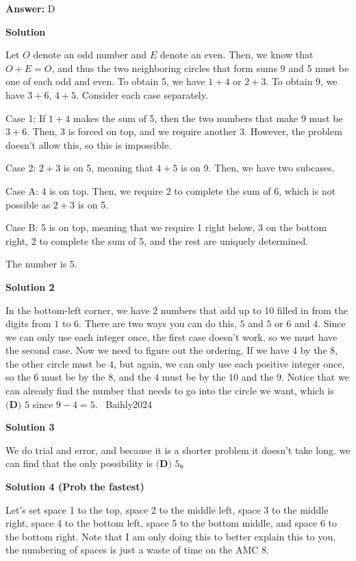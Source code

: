 \begin{enumerate}
 \textbf{Answer: }D



\textbf{Solution}

Let $O$ denote an odd number and $E$ denote an even. Then, we know that $O+E = O$, and thus the two neighboring circles that form sums 9 and 5 must be one of each odd and even. To obtain 5, we have $1+4$ or $2+3$. To obtain 9, we have $3+6$, $4+5$. Consider each case separately.

 Case 1: If $1+4$ makes the sum of 5, then the two numbers that make 9 must be $3+6$. Then, 3 is forced on top, and we require another 3. However, the problem doesn't allow this, so this is impossible.

 Case 2: $2+3$ is on 5, meaning that $4+5$ is on 9. Then, we have two subcases.

 Case A: 4 is on top. Then, we require 2 to complete the sum of 6, which is not possible as $2+3$ is on 5.

 Case B: 5 is on top, meaning that we require 1 right below, 3 on the bottom right, 2 to complete the sum of 5, and the rest are uniquely determined.

 The number is $\boxed{5}$.

 



\textbf{Solution 2}

In the bottom-left corner, we have 2 numbers that add up to 10 filled in from the digits from $1$ to $6$. There are two ways you can do this, $5$ and $5$ or $6$ and $4$. Since we can only use each integer once, the first case doesn't work, so we must have the second case. Now we need to figure out the ordering. If we have $4$ by the $8$, the other circle must be $4$, but again, we can only use each positive integer once, so the $6$ must be by the $8$, and the $4$ must be by the $10$ and the $9$. Notice that we can already find the number that needs to go into the circle we want, which is $\boxed{\textbf{(D) }5}$ since $9-4=5$. ~Baihly2024

 



\textbf{Solution 3}

We do trial and error, and because it is a shorter problem it doesn’t take long. we can find that the only possibility is $\boxed{\textbf{(D) }5}$。

 



\textbf{Solution 4 (Prob the fastest)}

Let's set space 1 to the top, space 2 to the middle left, space 3 to the middle right, space 4 to the bottom left, space 5  to the bottom middle, and space 6 to the bottom right. Note that I am only doing this to better explain this to you, the numbering of spaces is just a waste of time on the AMC 8.


\end{enumerate}
